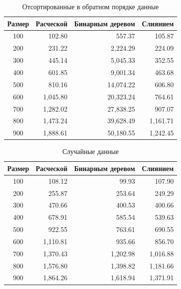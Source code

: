 \begin{table}[h]
	\begin{center}
		\begin{threeparttable}
		\captionsetup{singlelinecheck=off, justification=raggedright}
		\caption{Отсортированные в обратном порядке данные}
		\label{tbl:worth}
		\begin{tabular}{|c|r|r|r|}
			\hline
			 Размер & Расческой & Бинарным деревом & Слиянием \\
			\hline
			  100 & 102.80 & 557.37 & 105.87 \\ 
			\hline
			200 & 231.22 & 2,224.29 & 224.09 \\ 
			\hline
			300 & 445.14 & 5,045.33 & 352.55 \\ 
			\hline
			400 & 601.85 & 9,001.34 & 463.68 \\ 
			\hline
			500 & 810.16 & 14,074.22 & 606.80 \\ 
			\hline
			600 & 1,045.80 & 20,323.24 & 764.61 \\ 
			\hline
			700 & 1,282.02 & 27,838.25 & 907.07 \\ 
			\hline
			800 & 1,473.24 & 39,628.49 & 1,161.71 \\ 
			\hline
			900 & 1,888.61 & 50,180.55 & 1,242.45 \\ 
			\hline
		\end{tabular}
		\end{threeparttable}
    \end{center}
\end{table}

\begin{table}[h]
	\begin{center}
		\begin{threeparttable}
		\captionsetup{singlelinecheck=off, justification=raggedright}
		\caption{Случайные данные}
		\label{tbl:random}
		\begin{tabular}{|c|r|r|r|}
			\hline
			 Размер & Расческой & Бинарным деревом & Слиянием \\
			\hline
			  100 & 108.12 & 99.93 & 107.90 \\ 
			\hline
			200 & 255.87 & 253.64 & 249.29 \\ 
			\hline
			300 & 470.66 & 400.53 & 400.66 \\ 
			\hline
			400 & 678.91 & 585.54 & 539.63 \\ 
			\hline
			500 & 922.55 & 763.61 & 690.55 \\ 
			\hline
			600 & 1,110.81 & 935.66 & 856.70 \\ 
			\hline
			700 & 1,370.43 & 1,202.98 & 1,016.88 \\ 
			\hline
			800 & 1,576.80 & 1,398.82 & 1,181.66 \\ 
			\hline
			900 & 1,864.26 & 1,618.94 & 1,371.91 \\ 
			\hline
		\end{tabular}
		\end{threeparttable}
    \end{center}
\end{table}

